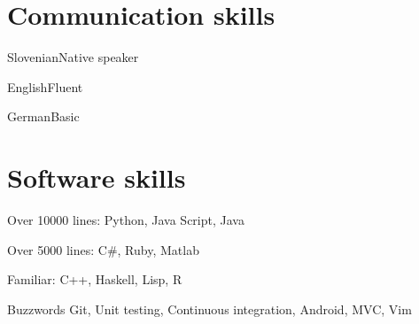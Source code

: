 \documentclass{tccv}
\begin{document}
\section{Communication skills}

\begin{factlist}
\item{Slovenian}{Native speaker}
\item{English}{Fluent}
\item{German}{Basic}
\end{factlist}

\section{Software skills}

\begin{factlist}

\item{Over 10000 lines:}
     {Python, Java Script, Java}

\item{Over 5000 lines:}
     {C\#, Ruby, Matlab}
     
\item{Familiar:}
     {C++, Haskell, Lisp, R}

\item{Buzzwords}
     {Git, Unit testing, Continuous integration, Android, MVC, Vim}

\end{factlist}
\end{document}
